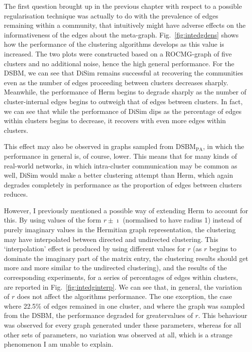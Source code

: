The first question brought up in the previous chapter with respect to a possible regularisation 
technique was actually to do with the prevalence of edges remaining within a community, that 
intuitively might have adverse effects on the informativeness of the edges about the meta-graph. 
Fig.\ \ref{fig:intedgdens} shows how the performance of the clustering algorithms develops as this 
value is increased. The two plots were constructed based on a ROCMG-graph of five clusters and no 
additional noise, hence the high general performance. For the DSBM, we can see that DiSim remains 
successful at recovering the communities even as the number of edges proceeding between clusters 
decreases sharply. Meanwhile, the performance of Herm begins to degrade sharply as the number of 
cluster-internal edges begins to outweigh that of edges between clusters. In fact, we can see that 
while the performance of DiSim dips as the percentage of edges within clusters begins to decrease, 
it recovers with even more edges within clusters.

This effect may also be observed in graphs sampled from $\mathrm{DSBM}_\mathrm{PA}$, in which the 
performance in general is, of course, lower. This means that for many kinds of real-world networks, 
in which intra-cluster communication may be common as well, DiSim would make a better clustering 
attempt than Herm, which again degrades completely in performance as the proportion of edges 
between clusters reduces.

However, I previously mentioned a possible way of extending Herm to account for this. By using 
values of the form $r \pm \imath$ (normalised to have radius 1) instead of purely imaginary values 
in the Hermitian graph representation, the clustering may have interpolated between directed and 
undirected clustering. This `interpolation' effect is produced by using different values for $r$ 
(as $r$ begins to dominate the imaginary part of the matrix entry, the clustering results should 
get more and more similar to the undirected clustering), and the results of the corresponding 
experiments, for a series of percentages of edges within clusters, are reported in Fig.\ 
\ref{fig:intedginterp}. We can see that, in general, the variation of $r$ does not affect the 
algorithms performance. The one exception, the case where 22.5\% of edges remained in one cluster, 
and where the graph was sampled from the DSBM, the performance degraded for greatervalues of $r$. 
This behaviour was observed for every graph generated under these parameters, whereas for all 
other sets of parameters, no variation was observed at all, which is a strange phenomenon I am 
unable to explain.

